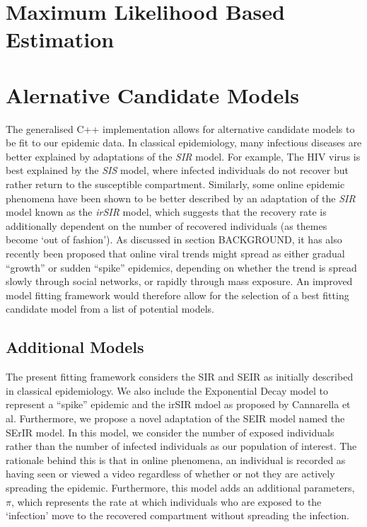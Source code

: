 \section{Maximum Likelihood Based Estimation}






\section{Alernative Candidate Models}

The generalised C++ implementation allows for alternative candidate
models to be fit to our epidemic data. In classical epidemiology, many
infectious diseases are better explained by adaptations of the
\emph{SIR} model. For example, The HIV virus is best explained by the
\emph{SIS} model, where infected individuals do not recover but rather
return to the susceptible compartment.\cite{vynnycky} Similarly, some online epidemic
phenomena have been shown to be better described by an adaptation of
the \emph{SIR} model known as the \emph{irSIR} model, which suggests
that the recovery rate is additionally dependent on the number of
recovered individuals (as themes become `out of
fashion').\cite{cannarella} As discussed in section BACKGROUND, it has
also recently been proposed that online viral trends might spread as either gradual
``growth'' or sudden ``spike'' epidemics, depending on whether the
trend is spread slowly through social networks, or rapidly through
mass exposure. An improved model fitting framework would
therefore allow for the selection of a best fitting candidate model
from a list of potential models.

\subsection{Additional Models}
The present fitting framework considers the SIR and SEIR as initially described
in classical epidemiology.\cite{vynnycky} We also include the Exponential Decay model
to represent a ``spike'' epidemic and the irSIR mdoel as proposed by
Cannarella et al.\cite{cannarella} Furthermore, we propose a novel
adaptation of the SEIR model named the SErIR model. In this model, we
consider the number of exposed individuals rather than the number of
infected individuals as our population of interest. The rationale
behind this is that in
online phenomena, an individual is recorded as having seen or viewed a
video regardless of whether or not they are actively spreading the
epidemic. Furthermore, this model adds an additional parameters,
$\pi$, which represents the rate at which individuals who are exposed
to the `infection' move to the recovered compartment without spreading the infection.

